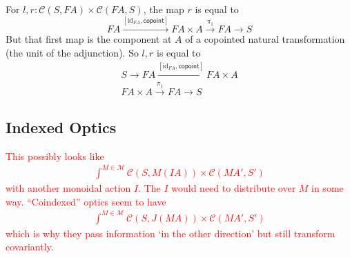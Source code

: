 \documentclass[11pt,a4paper]{article}
\theoremstyle{plain}
\theoremstyle{definition}
\newcommand{\C}{\mathscr{C}}
\newcommand{\M}{\mathscr{M}}
\newcommand{\id}{\mathrm{id}}
\newcommand{\todo}[1]{\textcolor{red}{\small #1}}
\begin{document}
For $l, r : \C(S, FA) \times \C(FA, S)$, the map $r$ is equal to
\[
  FA \xrightarrow{[\id_{FA}, \mathsf{copoint}]} FA \times A \xrightarrow{\pi_1} FA \to S
\]
But that first map is the component at $A$ of a copointed natural transformation (the unit of the adjunction). So $l, r$ is equal to
\begin{align*}
  S \to FA \xrightarrow{[\id_{FA}, \mathsf{copoint}]} FA \times A\\
  FA \times A \xrightarrow{\pi_1} FA \to S
\end{align*}


\subsection{Indexed Optics}
\todo{
  This possibly looks like
  \begin{align*}
    \int^{M \in \M} \C(S, M(IA)) \times \C(M A', S')
  \end{align*}
  with another monoidal action $I$. The $I$ would need to distribute over $M$ in some way. ``Coindexed'' optics seem to have
  \begin{align*}
    \int^{M \in \M} \C(S, J(MA)) \times \C(M A', S')
  \end{align*}
  which is why they pass information `in the other direction' but still transform covariantly.
}
\end{document}
